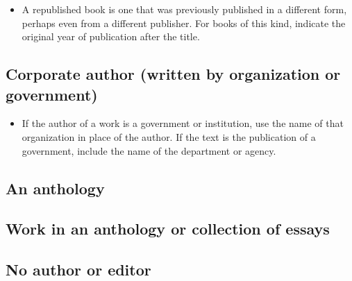 
\begin{itemize}\item A republished book is one that was previously published in a different form, perhaps even from a different publisher. For books of this kind, indicate the original year of publication after the title. \end{itemize}

\subsection{Corporate author (written by organization or government)}



\medskip 


\begin{itemize}\item If the author of a work is a government or institution, use the name of that organization in place of the author. If the text is the publication of a government, include the name of the department or agency. \end{itemize}

\subsection{An anthology}

\subsection{Work in an anthology or collection of essays}

\subsection{No author or editor}

